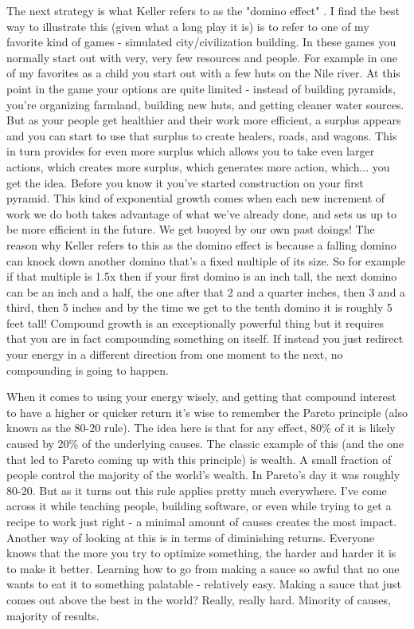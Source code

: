 \documentclass[11pt,a5paper]{book}
\begin{document}
The next strategy is what Keller refers to as the "domino effect" \cite{keller}. I find the best way to illustrate this (given what a long play it is) is to refer to one of my favorite kind of games - simulated city/civilization building. In these games you normally start out with very, very few resources and people. For example in one of my favorites as a child you start out with a few huts on the Nile river. At this point in the game your options are quite limited - instead of building pyramids, you're organizing farmland, building new huts, and getting cleaner water sources. But as your people get healthier and their work more efficient, a surplus appears and you can start to use that surplus to create healers, roads, and wagons. This in turn provides for even more surplus which allows you to take even larger actions, which creates more surplus, which generates more action, which... you get the idea. Before you know it you've started construction on your first pyramid. This kind of exponential growth comes when each new increment of work we do both takes advantage of what we've already done, and sets us up to be more efficient in the future. We get buoyed by our own past doings! The reason why Keller refers to this as the domino effect is because a falling domino can knock down another domino that's a fixed multiple of its size. So for example if that multiple is 1.5x then if your first domino is an inch tall, the next domino can be an inch and a half, the one after that 2 and a quarter inches, then 3 and a third, then 5 inches and by the time we get to the tenth domino it is roughly 5 feet tall! Compound growth is an exceptionally powerful thing but it requires that you are in fact compounding something on itself. If instead you just redirect your energy in a different direction from one moment to the next, no compounding is going to happen.
\newline

When it comes to using your energy wisely, and getting that compound interest to have a higher or quicker return it's wise to remember the Pareto principle (also known as the 80-20 rule). The idea here is that for any effect, 80\% of it is likely caused by 20\% of the underlying causes. The classic example of this (and the one that led to Pareto coming up with this principle) is wealth. A small fraction of people control the majority of the world's wealth. In Pareto's day it was roughly 80-20. But as it turns out this rule applies pretty much everywhere. I've come across it while teaching people, building software, or even while trying to get a recipe to work just right - a minimal amount of causes creates the most impact. Another way of looking at this is in terms of diminishing returns. Everyone knows that the more you try to optimize something, the harder and harder it is to make it better. Learning how to go from making a sauce so awful that no one wants to eat it to something palatable - relatively easy. Making a sauce that just comes out above the best in the world? Really, really hard. Minority of causes, majority of results. 
\newline
\end{document}
